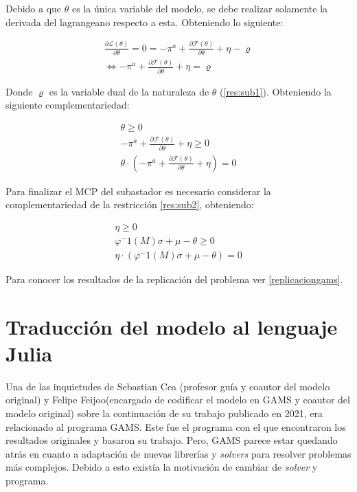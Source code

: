 Debido a que $\theta$ es la única variable del modelo, se debe realizar solamente la derivada del lagrangeano respecto a esta. Obteniendo lo siguiente:

\begin{footnotesize}
\begin{align}
    \frac{\partial \mathcal{L}(\theta) }{\partial \theta} = 0 =  -\pi^a + \frac{\partial\mathcal{F}(\theta)}{\partial \theta} + \eta - \varrho \\
    \Leftrightarrow -\pi^a + \frac{\partial\mathcal{F}(\theta)}{\partial \theta} + \eta = \varrho \label{kkt:subastadororiginal}
\end{align}

\end{footnotesize}

Donde $\varrho$ es la variable dual de la naturaleza de $\theta$ (\ref{res:sub1}). Obteniendo la siguiente complementariedad:

\begin{footnotesize}
\begin{align}
    \theta \geq 0 \\
    -\pi^a + \frac{\partial\mathcal{F}(\theta)}{\partial \theta} + \eta \geq 0\\
    \theta \cdot (-\pi^a + \frac{\partial\mathcal{F}(\theta)}{\partial \theta} + \eta)=0
\end{align}

\end{footnotesize}

Para finalizar el MCP del subastador es necesario considerar la complementariedad de la restricción \ref{res:sub2}, obteniendo: 

\begin{footnotesize}
\begin{align}
 \eta \geq 0 \\
 \varphi^-1(M)\sigma+\mu-\theta \geq 0 \\
 \eta \cdot (\varphi^-1(M)\sigma+\mu-\theta)=0
\end{align}
\end{footnotesize}


Para conocer los resultados de la replicación del problema ver \ref{replicaciongams}.

\section{Traducción del modelo al lenguaje Julia}

Una de las inquietudes de Sebastian Cea (profesor guía y coautor del modelo original) y Felipe Feijoo(encargado de codificar el modelo en GAMS y coautor del modelo original) sobre la continuación de su trabajo publicado en 2021, era relacionado al programa GAMS. Este fue el programa con el que encontraron los resultados originales y basaron su trabajo. Pero, GAMS parece estar quedando atrás en cuanto a adaptación de nuevas librerías y \textit{solvers} para resolver problemas más complejos. Debido a esto existía la motivación de cambiar de \textit{solver} y programa.
\vspace{2.5mm}

